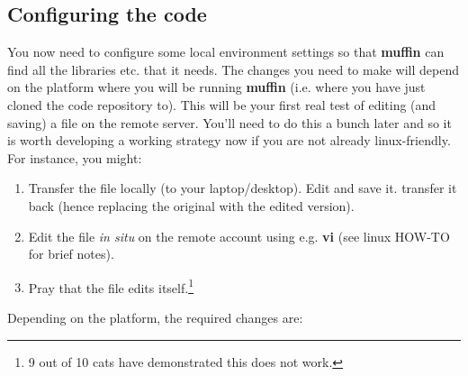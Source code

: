 \documentclass[11pt,fleqn]{book} %
\begin{document}
\subsection{Configuring the code}

\noindent You now need to configure some local environment settings so that \textbf{muffin} can find all the libraries etc. that it needs. The changes you need to make will depend on the platform where you will be running \textbf{muffin} (i.e. where you have just cloned the code repository to). This will be your first real test of editing (and saving) a file on the remote server. You'll need to do this a bunch later and so it is worth developing a working strategy now if you are not already linux-friendly. For instance, you might:

\begin{enumerate}[noitemsep]
\vspace{1mm}
\item Transfer the file locally (to your laptop/desktop). Edit and save it. transfer it back (hence replacing the original with the edited version).
\vspace{1mm}
\item Edit the file \textit{in situ} on the remote account using e.g. \textbf{vi} (see linux HOW-TO for brief notes). 
\vspace{1mm}
\item Pray that the file edits itself.\footnote{9 out of 10 cats have demonstrated this does not work.}
\end{enumerate}

\vspace{1mm}
\noindent Depending on the platform, the required changes are:
\end{document}

